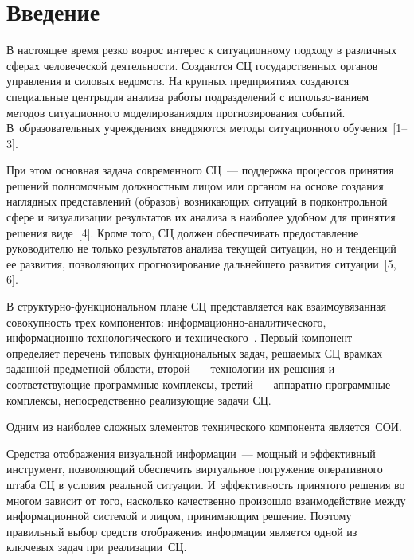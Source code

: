       \begin{multicols}{2}

      \label{st\stat}
      
\section{Введение}

В настоящее время резко возрос интерес к 
ситуационному подходу в различных сферах человеческой деятельности. 
Создаются СЦ государственных органов управления 
и силовых ведомств. На крупных предприятиях создаются специальные 
центры\linebreak для анализа работы подразделений с использо-\linebreak ванием методов 
ситуационного моделирования\linebreak для прогнозирования событий. 
В~образовательных учреждениях внедряются методы ситуационного 
обучения~[1--3]. 
     
     При этом основная задача современного СЦ~--- поддержка процессов 
принятия решений полномочным должностным лицом или органом на 
основе создания наглядных представлений (образов) возникающих ситуаций 
в подконтрольной сфере и визуализации результатов их анализа в наиболее 
удобном для принятия решения виде~[4]. Кроме того, СЦ должен обеспечивать 
предоставление руководителю не только результатов анализа текущей 
ситуации, но и тенденций ее развития, позволя\-ющих  
прогнозирование дальнейшего развития ситуации~[5, 6].
     
     В структурно-функциональном плане СЦ представляется как 
взаимоувязанная совокупность трех компонентов: ин\-фор\-ма\-ци\-он\-но-ана\-ли\-ти\-че\-ско\-го, 
ин\-фор\-ма\-ци\-он\-но-тех\-но\-ло\-ги\-че\-ско\-го и 
технического~\cite{1chu}. Первый компонент определяет перечень типовых 
функциональных задач, решаемых СЦ в\linebreak рамках заданной предметной 
области, второй~--- технологии их решения и соответствующие прог\-рам\-мные 
комплексы, третий~--- аппаратно-прог\-рам\-мные комплексы, 
непосредственно реали\-зу\-ющие задачи СЦ. 
    
    Одним из наиболее сложных элементов технического компонента 
является~СОИ. 
    
    Средства отображения визуальной информации~--- мощный и 
эффективный инструмент, позволяющий обеспечить виртуальное 
погружение оперативного штаба СЦ в условия реальной ситуации. 
И~эффективность принятого решения во многом зависит от того, насколько 
качественно произошло взаимодействие между информационной системой и 
лицом, принимающим решение. Поэтому правильный выбор средств 
отображения информации является одной из ключевых задач при реализации~СЦ. 
    

\end{multicols}
